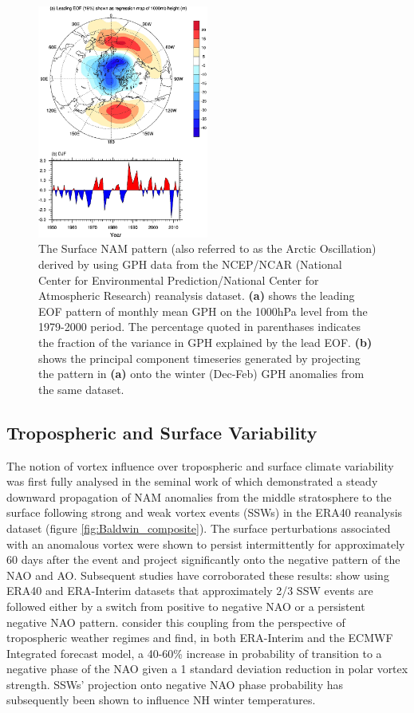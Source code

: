 \begin{figure}[h!]
\centering
    \includegraphics[width=0.5\textwidth]{Figures/Figures-background/AO_pattern.jpg}
    \caption{The Surface NAM pattern (also referred to as the Arctic Oscillation) derived by \cite{hegyiDynamical2011b} using GPH data from the NCEP/NCAR (National Center for Environmental Prediction/National Center for Atmospheric Research) reanalysis dataset. \textbf{(a)} shows the leading EOF pattern of monthly mean GPH on the 1000hPa level from the 1979-2000 period. The percentage quoted in parenthases indicates the fraction of the variance in GPH explained by the lead EOF. \textbf{(b)} shows the principal component timeseries generated by projecting the pattern in \textbf{(a)} onto the winter (Dec-Feb) GPH anomalies from the same dataset.}
\centering
\label{fig:AO}
\end{figure}


\subsection{Tropospheric and Surface Variability}
The notion of vortex influence over tropospheric and surface climate variability was first fully analysed in the seminal work of \cite{baldwinStratospheric2001a} which demonstrated a steady downward propagation of NAM anomalies from the middle stratosphere to the surface following strong and weak vortex events (SSWs) in the ERA40 reanalysis dataset (figure \ref{fig:Baldwin_composite}). The surface perturbations associated with an anomalous vortex were shown to persist intermittently for approximately 60 days after the event and project significantly onto the negative pattern of the NAO and AO. Subsequent studies have corroborated these results: \cite{domeisenEstimating2019d} show using ERA40 and ERA-Interim datasets that approximately 2/3 SSW events are followed either by a switch from positive to negative NAO or a persistent negative NAO pattern. \cite{charlton-perezInfluence2018e} consider this coupling from the perspective of tropospheric weather regimes and find, in both ERA-Interim and the ECMWF Integrated forecast model, a 40-60\% increase in probability of transition to a negative phase of the NAO given a 1 standard deviation reduction in polar vortex strength. SSWs' projection onto negative NAO phase probability has subsequently been shown to influence NH winter temperatures.

